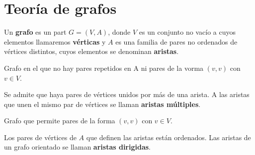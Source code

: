 \chapter{Teoría de grafos}
\begin{fdefinition}[Grafo]
\normalfont Un \textbf{grafo} es un part $\displaystyle G = \left(V,A\right) $, donde $\displaystyle V $ es un conjunto no vacío a cuyos elementos llamaremos \textbf{vérticas} y $\displaystyle A $ es una familia de pares no ordenados de vértices distintos, cuyos elementos se denominan \textbf{aristas}.
\end{fdefinition}
\begin{fdefinition}
\normalfont Grafo en el que no hay pares repetidos en A ni pares de la vorma $\displaystyle \left(v,v\right) $ con $\displaystyle v \in V $.
\end{fdefinition}
\begin{fdefinition}[Multigrafo]
\normalfont Se admite que haya pares de vértices unidos por más de una arista. A las aristas que unen el mismo par de vértices se llaman \textbf{aristas múltiples}.
\end{fdefinition}
\begin{fdefinition}[Pseudografo]
\normalfont Grafo que permite pares de la forma $\displaystyle \left(v,v\right) $ con $\displaystyle v \in V $.
\end{fdefinition}
\begin{fdefinition}
\normalfont Los pares de vértices de $\displaystyle A $ que definen las aristas están ordenados. Las aristas de un grafo orientado se llaman \textbf{aristas dirigidas}.
\end{fdefinition}
